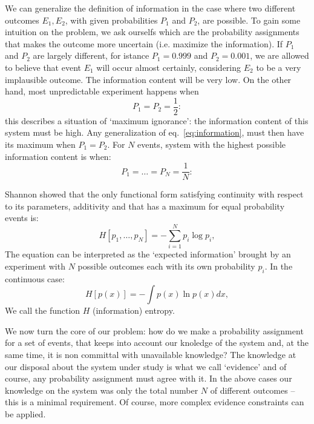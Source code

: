 \documentclass[twocolumn,showpacs,preprintnumbers,nofootinbib,prd,
superscriptaddress,10pt]{revtex4-1}
\begin{document}
We can generalize the definition of information in the case where two different outcomes $E_1, E_2$, with given probabilities $P_1$ and $P_2$, are possible.
To gain some intuition on the problem, we ask ourselfs which are the probability assignments that makes the outcome more uncertain (i.e. maximize the information).
If $P_1$ and $P_2$ are largely different, for istance $P_1 = 0.999$ and $P_2 = 0.001$, we are allowed to believe that event $E_1$ will occur almost certainly, considering $E_2$ to be a very implausible outcome. The information content will be very low.
On the other hand, most unpredictable experiment happens when 
\begin{equation}\nonumber
    P_1 = P_2 = \frac{1}{2}:
\end{equation}
this describes a situation of `maximum ignorance': the information content of this system must be high.
Any generalization of eq.~\eqref{eq:information}, must then have its maximum when $ P_1 = P_2$.
For $N$ events, system with the highest possible information content is when:
\begin{equation}\nonumber
    P_1 = \hdots = P_N = \frac{1}{N}:
\end{equation}

Shannon \cite{Shannon} showed that the only functional form satisfying continuity with respect to its parameters, additivity and that has a maximum for equal probability events is:
\begin{equation}\label{eq:entropy}
    H[p_1, \dots, p_N] = - \sum_{i = 1}^N p_i\log{p_i},
\end{equation}
The equation can be interpreted as the `expected information' brought by an experiment with $N$ possible outcomes each with its own probability $p_i$.
In the continuous case:
\begin{equation} \label{eq:entropy_continuos}
    H[p(x)] = - \int p(x)\ln p(x) dx,
\end{equation}
We call the function $H$ (information) entropy.

We now turn the core of our problem: how do we make a probability assignment for a set of events, that keeps into account our knoledge of the system and, at the same time, it is non committal with unavailable knowledge?
The knowledge at our disposal about the system under study is what we call `evidence' and of course, any probability assignment must agree with it.
In the above cases our knowledge on the system was only the total number $N$ of different outcomes -- this is a minimal requirement. Of course, more complex evidence constraints can be applied.
\end{document}
